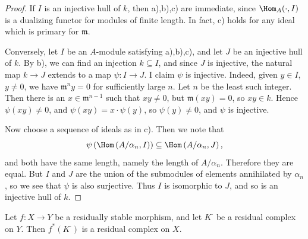 \documentclass[12pt]{book}
\begin{document}
\setcounter{page}{351}
\begin{proof}
If \(I\) is an injective hull of \(k\), then a),b),c) are immediate, since \(\Hom_{A}(\cdot, I)\) is a dualizing functor for
modules of finite length. In fact, c) holds for any ideal which is primary for \(\mathfrak{m}\).

Conversely, let \(I\) be an \(A\)-module satisfying a),b),c), and let \(J\) be an injective hull of \(k\).
By b), we can find an injection \(k \subseteq I\), and since \(J\) is injective, the natural map \(k \to J\) extends to a map \(\psi: I \to J\).
I claim \(\psi\) is injective. Indeed, given \(y \in I\), \(y \neq0\), we have \(\mathfrak{m}^{n} y=0\) for sufficiently large \(n\).
Let \(n\) be the least such integer. Then there is an \(x \in \mathfrak{m}^{n-1}\) such that \(xy \neq0\), but \(\mathfrak{m}(xy)=0\), so \(xy \in k\).
Hence \(\psi(xy) \neq0\), and \(\psi(xy)=x\cdot\psi(y)\), so \(\psi(y)\neq0\), and \(\psi\) is injective.

Now choose a sequence of ideals as in c). Then we note that
\[
\psi\left(\Hom\left(A / \alpha_{n}, I\right)\right) \subseteq \Hom\left(A / \alpha_{n}, J\right),
\]
and both have the same length, namely the length of \(A / \alpha_{n}\).
Therefore they are equal. But \(I\) and \(J\) are the union of the submodules of elements annihilated by \(\alpha_{n}\), so we see that \(\psi\) is also surjective.
Thus \(I\) is isomorphic to \(J\), and so is an injective hull of \(k\).
\end{proof}

\setcounter{page}{352}
\begin{proposition}
Let \(f: X \to Y\) be a residually stable morphism, and let \(K^{\cdot}\) be a residual complex on \(Y\). Then \(f^{*}(K^{\cdot})\) is a residual complex on \(X\).
\end{proposition}
\end{document}
